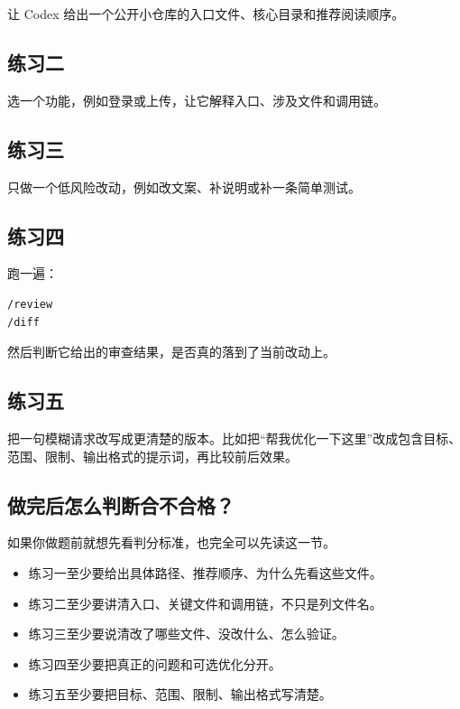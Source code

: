 \documentclass[UTF8,a4paper,11pt]{ctexart}
\begin{document}
让 Codex 给出一个公开小仓库的入口文件、核心目录和推荐阅读顺序。

\subsection{练习二}

选一个功能，例如登录或上传，让它解释入口、涉及文件和调用链。

\subsection{练习三}

只做一个低风险改动，例如改文案、补说明或补一条简单测试。

\subsection{练习四}

跑一遍：

\begin{lstlisting}[style=cli]
/review
/diff
\end{lstlisting}

然后判断它给出的审查结果，是否真的落到了当前改动上。

\subsection{练习五}

把一句模糊请求改写成更清楚的版本。比如把“帮我优化一下这里”改成包含目标、范围、限制、输出格式的提示词，再比较前后效果。

\subsection{做完后怎么判断合不合格？}

如果你做题前就想先看判分标准，也完全可以先读这一节。

\begin{itemize}
  \item 练习一至少要给出具体路径、推荐顺序、为什么先看这些文件。
  \item 练习二至少要讲清入口、关键文件和调用链，不只是列文件名。
  \item 练习三至少要说清改了哪些文件、没改什么、怎么验证。
  \item 练习四至少要把真正的问题和可选优化分开。
  \item 练习五至少要把目标、范围、限制、输出格式写清楚。
\end{itemize}
\end{document}
